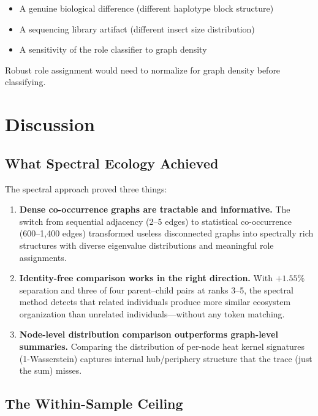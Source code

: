 \documentclass{../yalumba}
\begin{document}
\begin{itemize}
  \item A genuine biological difference (different haplotype block structure)
  \item A sequencing library artifact (different insert size distribution)
  \item A sensitivity of the role classifier to graph density
\end{itemize}

Robust role assignment would need to normalize for graph density before
classifying.


\section{Discussion}
\label{sec:discussion}

\subsection{What Spectral Ecology Achieved}

The spectral approach proved three things:

\begin{enumerate}
  \item \textbf{Dense co-occurrence graphs are tractable and informative.}  The
    switch from sequential adjacency (2--5 edges) to statistical co-occurrence
    (600--1{,}400 edges) transformed useless disconnected graphs into spectrally
    rich structures with diverse eigenvalue distributions and meaningful role
    assignments.
  \item \textbf{Identity-free comparison works in the right direction.}  With
    $+1.55\%$ separation and three of four parent--child pairs at ranks 3--5,
    the spectral method detects that related individuals produce more similar
    ecosystem organization than unrelated individuals---without any token
    matching.
  \item \textbf{Node-level distribution comparison outperforms graph-level
    summaries.}  Comparing the distribution of per-node heat kernel signatures
    (1-Wasserstein) captures internal hub/periphery structure that the trace
    (just the sum) misses.
\end{enumerate}

\subsection{The Within-Sample Ceiling}
\end{document}

